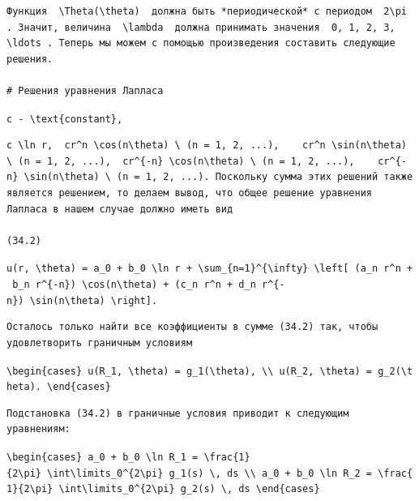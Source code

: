 \documentclass[
  ukrainian,
]{article}
\begin{document}
\begin{verbatim}
Функция  \Theta(\theta)  должна быть *периодической* с периодом  2\pi . Значит, величина  \lambda  должна принимать значения  0, 1, 2, 3, \ldots . Теперь мы можем с помощью произведения составить следующие решения.

# Решения уравнения Лапласа
\end{verbatim}

\texttt{c\ -\ \textbackslash{}text\{constant\},}

\begin{verbatim}
c \ln r,  cr^n \cos(n\theta) \ (n = 1, 2, ...),    cr^n \sin(n\theta) \ (n = 1, 2, ...),  cr^{-n} \cos(n\theta) \ (n = 1, 2, ...),    cr^{-n} \sin(n\theta) \ (n = 1, 2, ...). Поскольку сумма этих решений также является решением, то делаем вывод, что общее решение уравнения Лапласа в нашем случае должно иметь вид

(34.2)
\end{verbatim}

\texttt{u(r,\ \textbackslash{}theta)\ =\ a\_0\ +\ b\_0\ \textbackslash{}ln\ r\ +\ \textbackslash{}sum\_\{n=1\}\^{}\{\textbackslash{}infty\}\ \textbackslash{}left{[}\ (a\_n\ r\^{}n\ +\ b\_n\ r\^{}\{-n\})\ \textbackslash{}cos(n\textbackslash{}theta)\ +\ (c\_n\ r\^{}n\ +\ d\_n\ r\^{}\{-n\})\ \textbackslash{}sin(n\textbackslash{}theta)\ \textbackslash{}right{]}.}

\begin{verbatim}
Осталось только найти все коэффициенты в сумме (34.2) так, чтобы удовлетворить граничным условиям
\end{verbatim}

\texttt{\textbackslash{}begin\{cases\}\ u(R\_1,\ \textbackslash{}theta)\ =\ g\_1(\textbackslash{}theta),\ \textbackslash{}\textbackslash{}\ u(R\_2,\ \textbackslash{}theta)\ =\ g\_2(\textbackslash{}theta).\ \textbackslash{}end\{cases\}}

\begin{verbatim}
Подстановка (34.2) в граничные условия приводит к следующим уравнениям:
\end{verbatim}

\texttt{\textbackslash{}begin\{cases\}\ a\_0\ +\ b\_0\ \textbackslash{}ln\ R\_1\ =\ \textbackslash{}frac\{1\}\{2\textbackslash{}pi\}\ \textbackslash{}int\textbackslash{}limits\_0\^{}\{2\textbackslash{}pi\}\ g\_1(s)\ \textbackslash{},\ ds\ \textbackslash{}\textbackslash{}\ a\_0\ +\ b\_0\ \textbackslash{}ln\ R\_2\ =\ \textbackslash{}frac\{1\}\{2\textbackslash{}pi\}\ \textbackslash{}int\textbackslash{}limits\_0\^{}\{2\textbackslash{}pi\}\ g\_2(s)\ \textbackslash{},\ ds\ \textbackslash{}end\{cases\}}
\end{document}
